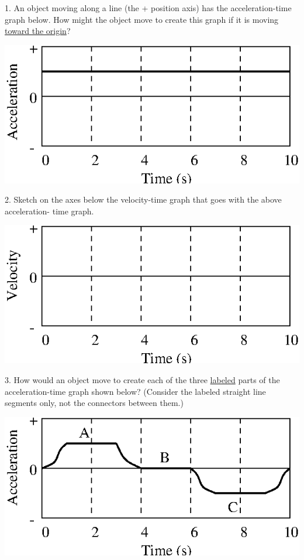 1. An object moving along a line (the + position axis) has the acceleration-time graph below. How might the object move to create this graph if it is moving
\underline{toward the origin}?

\vspace{0.3cm}
{\par\centering \includegraphics{slowing/slowing_fig6.eps} \par}
\vspace{0.3cm}

2. Sketch on the axes below the velocity-time graph that goes with the above
acceleration- time graph.

\vspace{0.3cm}
{\par\centering \includegraphics{slowing/slowing_fig7.eps} \par}
\vspace{0.3cm}

3. How would an object move to create each of the three \underline{labeled} parts of the
acceleration-time graph shown below? (Consider the labeled straight line segments only, not the connectors between them.)

\vspace{0.3cm}
{\par\centering \includegraphics{slowing/slowing_fig8.eps} \par}
\vspace{0.3cm}

